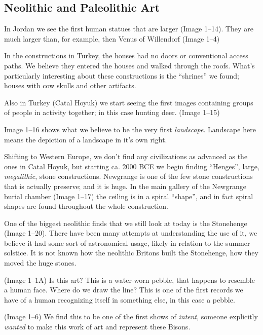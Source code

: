 \documentclass{article}
\begin{document}
    \begin{spacing}{1.2}
    \newpage
    \section{Neolithic and Paleolithic Art}
    In Jordan we see the first human statues that are larger (Image 1--14).
    They are much larger than, for example, then Venus of Willendorf 
    (Image 1--4)

    In the constructions in Turkey, the houses had no doors or conventional 
    access paths. We believe they entered the houses and walked through the
    roofs. What's particularly interesting about these constructions is the
    ``shrines'' we found; houses with cow skulls and other artifacts.

    Also in Turkey (Catal Hoyuk) we start seeing the first images containing
    groups of people in activity together; in this case hunting deer. 
    (Image 1--15)

    Image 1--16 shows what we believe to be the very first \emph{landscape}.
    Landscape here means the depiction of a landscape in it's own right.

    Shifting to Western Europe, we don't find any civilizations as advanced
    as the ones in Catal Hoyuk, but starting ca. 2000 BCE we begin finding
    ``Henges'', large, \emph{megalithic}, stone constructions. Newgrange is
    one of the few stone constructions that is actually preserve; and it is
    huge. In the main gallery of the Newgrange burial chamber (Image 1--17)
    the ceiling is in a spiral ``shape'', and in fact spiral shapes are
    found throughout the whole construction.
    
    One of the biggest neolithic finds that we still look at today is the
    Stonehenge (Image 1--20). There have been many attempts at understanding
    the use of it, we believe it had some sort of astronomical usage, likely 
    in relation to the summer solstice. It is not known how the neolithic
    Britons built the Stonehenge, how they moved the huge stones. 
    
    (Image 1--1A) Is this art? This is a water-worn pebble, that happens to 
    resemble a human face. Where do we draw the line? This is one of the first
    records we have of a human recognizing itself in something else, in this
    case a pebble.

    (Image 1--6) We find this to be one of the first shows of \emph{intent},
    someone explicitly \emph{wanted} to make this work of art and represent
    these Bisons. 


\end{spacing}
\end{document}
